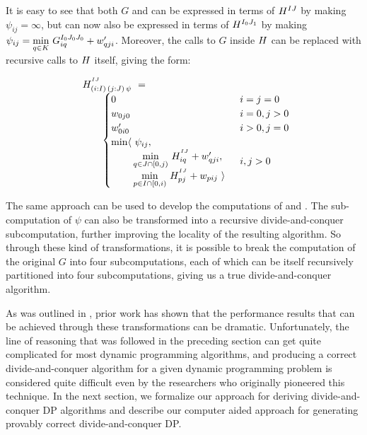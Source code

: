 It is easy to see that both $G$ and  can be expressed in terms of $H^{IJ}$ by making $\psi_{ij}=\infty$, 
but  can now also be expressed in terms of $H^{I_0J_1}$ by making 
$\psi_{ij} =  \underset{q\in K}\min ~ G^{I_0J_0J_0}_{iq} + w'_{qji}$.
Moreover, the calls to $G$ inside $H$ can be replaced with recursive calls to $H$ itself,
giving the form: 

\begin{equation}\LeftEqNo
\begin{array}{l@{}l}
	\Ggen^{^{IJ}}_{(i:I)\,(j:J)\,\psi} ~=~  \\
	\qquad
	\begin{cases}
		0                         & i=j=0 \\
		w_{0j0}                   & i=0, j>0 \\
		w'_{0i0}                  & i>0, j=0 \\
		\begin{array}{@{}l@{~}l}
		  \min\langle & \psi_{ij}, \\
		              & \!\underset{q\in J\cap[0,j)}\min ~ H^{^{IJ}}_{iq} + \yw{qji}, \\
		              & \!\underset{p\in I\cap[0,i)}\min ~ H^{^{IJ}}_{pj} + \xw{pij}~\rangle
		\end{array}              & i,j>0
	\end{cases}
\end{array}
\end{equation}

The same approach can be used to develop the computations of  and .
The sub-computation of $\psi$ can also be transformed into a recursive divide-and-conquer subcomputation, further improving the locality of the resulting algorithm.
So through these kind of transformations, it is possible to break the computation of the original $G$ into four subcomputations, each of which can be itself recursively partitioned into four subcomputations, giving us a true divide-and-conquer algorithm. 

As was outlined in , prior work has shown that the performance results that can be achieved through these transformations can be dramatic. Unfortunately, the line of reasoning that was followed in the preceding section can get quite complicated for most dynamic programming algorithms, and producing a correct divide-and-conquer algorithm for a given dynamic programming problem is considered quite difficult even by the researchers who originally pioneered this technique. In the next section, we formalize our approach for deriving divide-and-conquer DP algorithms and describe our computer aided approach for generating provably correct divide-and-conquer DP.


